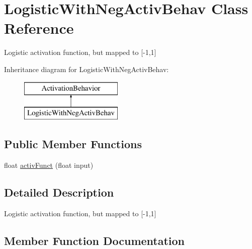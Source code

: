 \hypertarget{class_logistic_with_neg_activ_behav}{}\section{Logistic\+With\+Neg\+Activ\+Behav Class Reference}
\label{class_logistic_with_neg_activ_behav}


Logistic activation function, but mapped to \mbox{[}-\/1,1\mbox{]}  


Inheritance diagram for Logistic\+With\+Neg\+Activ\+Behav\+:\begin{figure}[H]
\begin{center}
\leavevmode
\includegraphics[height=2.000000cm]{class_logistic_with_neg_activ_behav}
\end{center}
\end{figure}
\subsection*{Public Member Functions}
\begin{DoxyCompactItemize}
\item 
float \mbox{\hyperlink{class_logistic_with_neg_activ_behav_abfe284e0e1854e171412cb2e6f0ad8e3}{activ\+Funct}} (float input)
\end{DoxyCompactItemize}


\subsection{Detailed Description}
Logistic activation function, but mapped to \mbox{[}-\/1,1\mbox{]} 



\subsection{Member Function Documentation}
\mbox{\label{class_logistic_with_neg_activ_behav_abfe284e0e1854e171412cb2e6f0ad8e3}} 
